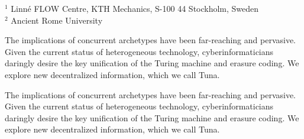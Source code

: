 %
%
%
%
\paperauthor[A. Beta, G. Delta \& E. Phi]
{%
  Alpha Beta$^1$, Gamma Delta$^2$ and Epsilon Phi$^2$] %
}%
%
%
\paperaffiliation
{%
      $^1$ Linn\'e FLOW Centre, KTH Mechanics, S-100 44 Stockholm, Sweden \\
      $^2$ Ancient Rome University
}%
%
%
%
%
%
%
%
%
%
%
%
\papersummary%
{%
    The implications of concurrent archetypes have been far-reaching and
pervasive. Given the current status of heterogeneous technology,
cyberinformaticians daringly desire the key unification of the Turing
machine and erasure coding. We explore new decentralized information,
which we call Tuna.

}%
%
\graphicspath{{paper1/}}%
%
%
%
\begin{paper}

\makepapertitle

%
\begin{paperabstract}
    The implications of concurrent archetypes have been far-reaching and
pervasive. Given the current status of heterogeneous technology,
cyberinformaticians daringly desire the key unification of the Turing
machine and erasure coding. We explore new decentralized information,
which we call Tuna.

\end{paperabstract}


%



%


%

\end{paper}